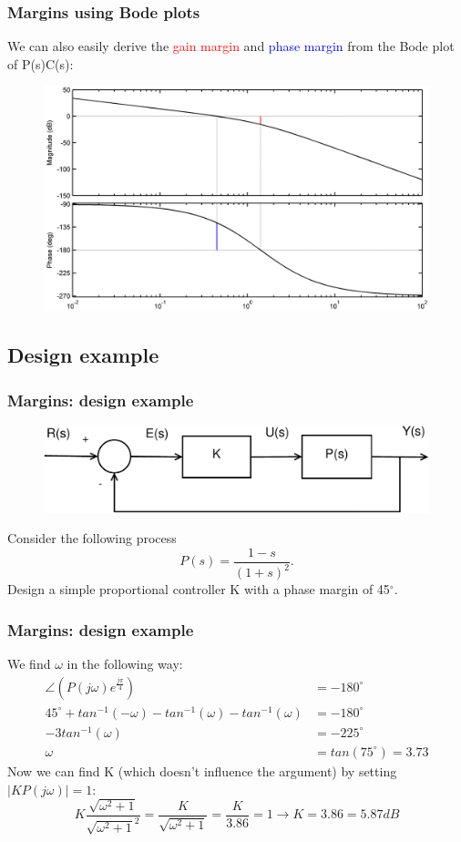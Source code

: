 \begin{frame}
	\frametitle{Margins using Bode plots}
	We can also easily derive the \textcolor{red}{gain margin} and \textcolor{blue}{phase margin} from the Bode plot of P(s)C(s):
	\vspace{-1ex}
	\begin{figure}
		\includegraphics[width=0.87\linewidth]{bode}
	\end{figure}
\end{frame}

\subsection{Design example}

\begin{frame}
	\frametitle{Margins: design example}
	\begin{figure}
		\includegraphics[width=0.8\linewidth]{closedloop2}
	\end{figure}
	Consider the following process $$P(s)=\frac{1-s}{(1+s)^2}.$$
	Design a simple proportional controller K with a phase margin of 45$^{\circ}$.
\end{frame}

\begin{frame}
	\frametitle{Margins: design example}
	We find $\omega$ in the following way:
	\begin{align*}
		\angle(P(j\omega)e^{\frac{j\pi}{4}})&=-180^{\circ}\\
		45^{\circ}+tan^{-1}(-\omega) -tan^{-1}(\omega)-tan^{-1}(\omega) &=-180^{\circ}\\
		-3tan^{-1}(\omega)&=-225^{\circ}\\
		\omega &= tan(75^{\circ})=3.73
	\end{align*}
	Now we can find K (which doesn't influence the argument) by setting $\big|KP(j\omega)\big|=1$:
	$$K\frac{\sqrt{\omega^2+1}}{\sqrt{\omega^2+1}^2}=\frac{K}{\sqrt{\omega^2+1}}=\frac{K}{3.86}=1\rightarrow K=3.86=5.87 dB$$
\end{frame}

